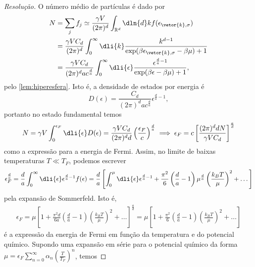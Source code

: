 \begin{proof}[Resolução]
    O número médio de partículas é dado por
    \begin{align*}
        N &= \sum_{j} f_j \simeq \frac{\gamma V}{(2\pi)^d}\int_{\mathbb{R}^d} \dln{d}k f(\epsilon_{\vetor{k}, \sigma})\\
          &= \frac{\gamma V C_d}{(2\pi)^d} \int_0^\infty \dli{k} \frac{k^{d - 1}}{\exp(\beta \epsilon_{\vetor{k},\sigma} - \beta \mu) + 1}\\
          &= \frac{\gamma V C_d}{(2\pi)^d ac^\frac{d}{a}} \int_0^\infty \dli{\epsilon}\frac{\epsilon^{\frac{d}{a} - 1}}{\exp(\beta \epsilon - \beta \mu) + 1},
    \end{align*}
    pelo \cref{lem:hiperesfera}. Isto é, a densidade de estados por energia é
    \begin{equation*}
        D(\epsilon) = \frac{C_d}{(2\pi)^d ac^{\frac{d}{a}}} \epsilon^{\frac{d}{a} - 1},
    \end{equation*}
    portanto no estado fundamental temos
    \begin{equation*}
        N = \gamma V \int_0^{\epsilon_F} \dli{\epsilon} D(\epsilon) = \frac{\gamma V C_d}{(2\pi)^d d } \left(\frac{\epsilon_F}{c}\right)^{\frac{d}{a}} \implies \epsilon_F = c \left[\frac{(2\pi)^{d} d N}{\gamma V C_d}\right]^{\frac{a}{d}} %
    \end{equation*}
    como a expressão para a energia de Fermi. Assim, no limite de baixas temperaturas \(T \ll T_F\), podemos escrever
    \begin{equation*}
        \epsilon_F^{\frac{d}{a}} = \frac{d}{a}\int_0^\infty \dli{\epsilon} \epsilon^{\frac{d}{a} - 1}f(\epsilon) = \frac{d}{a}\left[\int_0^\mu \dli{\epsilon} \epsilon^{\frac{d}{a} - 1} + \frac{\pi^2}{6} \left(\frac{d}{a} - 1\right)\mu^{\frac{d}{a}}\left(\frac{k_B T}{\mu}\right)^2 + \dots\right] %
    \end{equation*}
    pela expansão de Sommerfeld. Isto é,
    \begin{align*}
        \epsilon_F = \mu\left[1 + \frac{\pi^2d}{6a}\left(\frac{d}{a}- 1\right)\left(\frac{k_BT}{\mu}\right)^2+ \dots\right]^{\frac{a}{d}} = \mu\left[1 + \frac{\pi^2}{6}\left(\frac{d}{a} -1\right)\left(\frac{k_B T}{\mu}\right)^2 + \dots\right]
    \end{align*}
    é a expressão da energia de Fermi em função da temperatura e do potencial químico. Supondo uma expansão em série para o potencial químico da forma \(\mu = \epsilon_F\sum_{n = 0}^\infty \alpha_n \left(\frac{T}{T_F}\right)^n\), temos

\end{proof}
